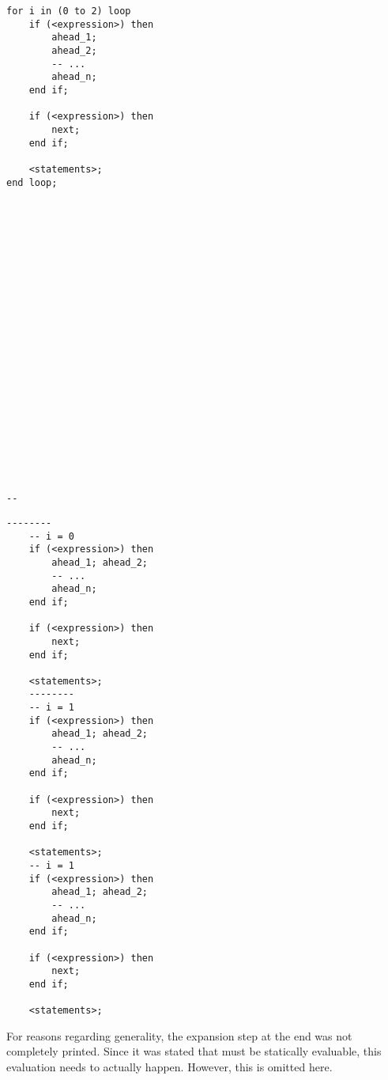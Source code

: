 \noindent\begin{minipage}{0.45\textwidth}
\begin{lstlisting}[style=vhdl,caption={Unrolling
      Scheme -- First transformation},label={lst:unrollingSchemeA}]
for i in (0 to 2) loop
    if (<expression>) then
        ahead_1;
        ahead_2;
        -- ...
        ahead_n;
    end if;

    if (<expression>) then
        next;
    end if;

    <statements>;
end loop;























--
\end{lstlisting}
\end{minipage}\hfill
\begin{minipage}{0.45\textwidth}
\begin{lstlisting}[style=vhdl,caption={Unrolling
      Scheme -- Second transformation},label={lst:unrollingSchemeB}]
    --------
    -- i = 0
    if (<expression>) then
        ahead_1; ahead_2;
        -- ...
        ahead_n;
    end if;

    if (<expression>) then
        next;
    end if;

    <statements>;
    --------
    -- i = 1
    if (<expression>) then
        ahead_1; ahead_2;
        -- ...
        ahead_n;
    end if;

    if (<expression>) then
        next;
    end if;

    <statements>;
    -- i = 1
    if (<expression>) then
        ahead_1; ahead_2;
        -- ...
        ahead_n;
    end if;

    if (<expression>) then
        next;
    end if;

    <statements>;
\end{lstlisting}
\end{minipage}

\noindent{}For reasons regarding generality, the expansion step at the
end was not completely printed. Since it was stated that 
must be
statically evaluable, this evaluation needs to actually
happen. However, this is omitted here.

